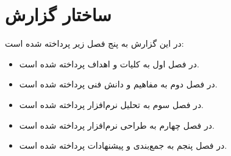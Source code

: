 \section{ساختار گزارش}
در این گزارش به پنج فصل زیر پرداخته شده است:
\begin{itemize}
	\item
	در فصل اول به کلیات و اهداف پرداخته شده است.
	\item
	در فصل دوم به مفاهیم و دانش فنی پرداخته شده است.
	\item
	در فصل سوم به تحلیل نرم‌افزار پرداخته شده است.
	\item
	در فصل چهارم به طراحی نرم‌افزار پرداخته شده است.
	\item
	در فصل پنجم به جمع‌بندی و پیشنهادات پرداخته شده است.
\end{itemize}
